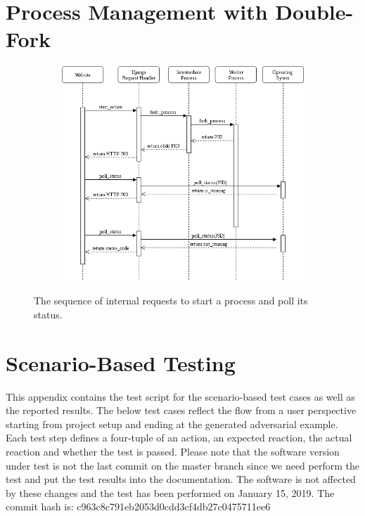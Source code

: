 \clearpage
\appendix
\section{Process Management with Double-Fork}\label{app:doublefork}
\begin{figure}[H]\label{fig:process_sequence}
	\centering
	\begin{subfigure}{1.2\linewidth}
		\centering
		\includegraphics[width=1.5\linewidth]{figs/process_sequence}
	\end{subfigure}
	\caption{The sequence of internal requests to start a process and poll its status.}
\end{figure}

\clearpage
\section{Scenario-Based Testing}\label{app:scenariotest}
This appendix contains the test script for the scenario-based test cases as well as the reported results.
The below test cases reflect the flow from a user perspective starting from project setup and ending at the generated adversarial example.
Each test step defines a four-tuple of an action, an expected reaction, the actual reaction and whether the test is passed.
Please note that the software version under test is not the last commit on the master branch since we need perform the test and put the test results into the documentation.
The software is not affected by these changes and the test has been performed on January 15, 2019.
The commit hash is: c963c8c791eb2053d0cdd3cf4db27c0475711ee6 


